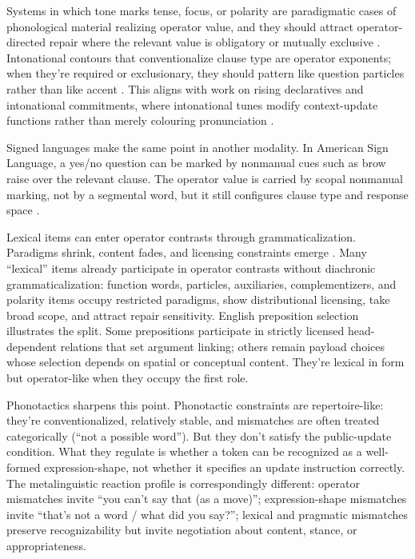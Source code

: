 \documentclass[12pt,letterpaper]{article}
\begin{document}
Systems in which tone marks tense, focus, or polarity are paradigmatic cases of phonological material realizing operator value, and they should attract operator-directed repair where the relevant value is obligatory or mutually exclusive \citep{hyman2011}. Intonational contours that conventionalize clause type are operator exponents; when they're required or exclusionary, they should pattern like question particles rather than like accent \citep{ladd2008}. This aligns with work on rising declaratives and intonational commitments, where intonational tunes modify context-update functions rather than merely colouring pronunciation \citep{gunlogson2003true,rudin2022intonational}.

Signed languages make the same point in another modality. In American Sign Language, a yes/no question can be marked by nonmanual cues such as brow raise over the relevant clause. The operator value is carried by scopal nonmanual marking, not by a segmental word, but it still configures clause type and response space \citep{sandlerlillomartin2006}.

Lexical items can enter operator contrasts through grammaticalization. Paradigms shrink, content fades, and licensing constraints emerge \citep{hoppertraugott2003,bybee2010}. Many \enquote{lexical} items already participate in operator contrasts without diachronic grammaticalization: function words, particles, auxiliaries, complementizers, and polarity items occupy restricted paradigms, show distributional licensing, take broad scope, and attract repair sensitivity. English preposition selection illustrates the split. Some prepositions participate in strictly licensed head-dependent relations that set argument linking; others remain payload choices whose selection depends on spatial or conceptual content. They're lexical in form but operator-like when they occupy the first role.

Phonotactics sharpens this point. Phonotactic constraints are repertoire-like: they're conventionalized, relatively stable, and mismatches are often treated categorically (\enquote{not a possible word}). But they don't satisfy the public-update condition. What they regulate is whether a token can be recognized as a well-formed expression-shape, not whether it specifies an update instruction correctly. The metalinguistic reaction profile is correspondingly different: operator mismatches invite \enquote{you can't say that (as a move)}; expression-shape mismatches invite \enquote{that's not a word / what did you say?}; lexical and pragmatic mismatches preserve recognizability but invite negotiation about content, stance, or appropriateness.
\end{document}
